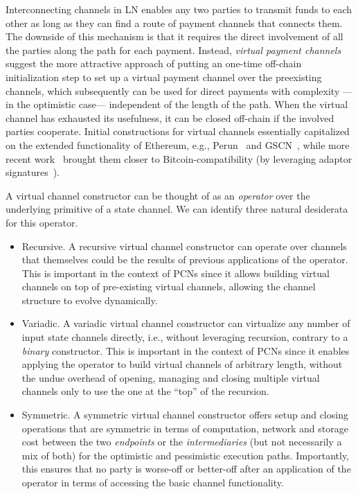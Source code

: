 Interconnecting channels in LN enables any two parties to transmit funds
to each other as long as they can find a route of payment channels that connects
them. The downside of this mechanism is that it requires the direct involvement
of all the parties along the path for each payment. Instead, \emph{virtual payment
channels} suggest the more attractive approach of putting an one-time off-chain
initialization step to set up a virtual payment channel over the preexisting
channels, which subsequently can
be used for direct payments with complexity ---in the optimistic case---
independent of the length of the path. When the virtual channel has exhausted
its usefulness, it can be closed off-chain if the involved parties cooperate.
Initial constructions for virtual channels essentially capitalized on the extended functionality of Ethereum, e.g.,
Perun~\cite{perun} and GSCN~\cite{DBLP:conf/ccs/DziembowskiFH18}, while more
recent work~\cite{9519487} brought them closer to
Bitcoin-compatibility (by leveraging adaptor
signatures~\cite{DBLP:journals/iacr/AumayrEEFHMMR20}).

A virtual channel constructor can be thought of as an \emph{operator} over the
underlying primitive of a state channel. We can identify three natural
desiderata for this operator.

\begin{itemize}
\item Recursive. A recursive virtual channel constructor can operate over
channels that themselves could be the results of previous applications of the
operator. This is important in the context of PCNs since it allows building
virtual channels on top of pre-existing virtual channels, allowing the channel
structure to evolve dynamically.
\item Variadic. A variadic virtual channel constructor can virtualize any number
of input state channels directly, i.e., without leveraging recursion, contrary to a \emph{binary} constructor. This is
important in the context of PCNs since it enables applying the operator to build
virtual channels of arbitrary length, without the undue overhead of opening,
managing and closing multiple virtual channels only to use the one at the
``top'' of the recursion.
\item Symmetric. A symmetric virtual channel constructor offers setup and
closing operations that are symmetric in terms of computation, network and storage cost between the two
\emph{endpoints} or the \emph{intermediaries} (but not necessarily
a mix of both) for the
optimistic and pessimistic execution paths. Importantly, this ensures that no
party is worse-off or better-off after an application of the operator in terms
of accessing the basic channel functionality.
\end{itemize}

